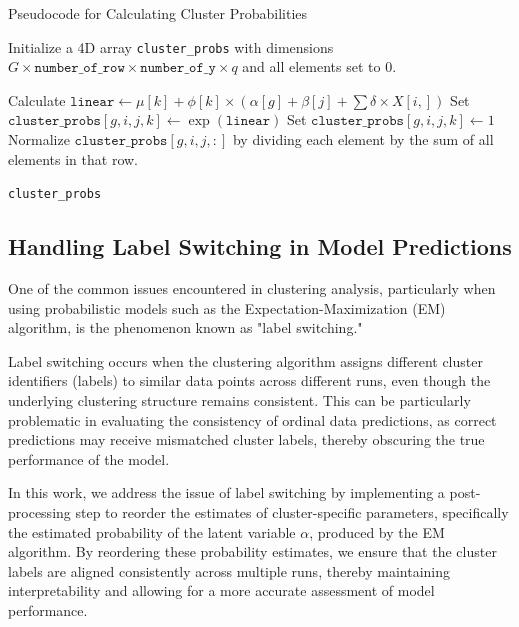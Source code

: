 \documentclass{article}
\begin{document}
\begin{algorithm}
  \caption{Pseudocode for Calculating Cluster Probabilities}
  \label{fig:algo}
  \begin{algorithmic}[1]
  \STATE Initialize a 4D array \texttt{cluster\_probs} with dimensions $G \times \texttt{number\_of\_row} \times \texttt{number\_of\_y} \times q$ and all elements set to 0.
  
                      \STATE Calculate $\texttt{linear} \gets \mu[k] + \phi[k] \times (\alpha[g] + \beta[j] + \sum \delta \times X[i,])$
                      \STATE Set $\texttt{cluster\_probs}[g, i, j, k] \gets \exp(\texttt{linear})$
                  \ELSE
                      \STATE Set $\texttt{cluster\_probs}[g, i, j, k] \gets 1$
                  \ENDIF
              \ENDFOR
              \STATE Normalize $\texttt{cluster\_probs}[g, i, j, :]$ by dividing each element by the sum of all elements in that row.
          \ENDFOR
      \ENDFOR
  \ENDFOR
  
  \RETURN \texttt{cluster\_probs}
  \end{algorithmic}
\end{algorithm}

\subsection{Handling Label Switching in Model Predictions}

One of the common issues encountered in clustering analysis, 
particularly when using probabilistic models such as the Expectation-Maximization (EM) algorithm, 
is the phenomenon known as "label switching." 

Label switching occurs when the clustering algorithm assigns different cluster identifiers (labels) to similar data points across different runs, 
even though the underlying clustering structure remains consistent. 
This can be particularly problematic in evaluating the consistency of ordinal data predictions, 
as correct predictions may receive mismatched cluster labels, 
thereby obscuring the true performance of the model.

In this work, we address the issue of label switching by implementing a post-processing step to reorder the estimates of cluster-specific parameters, 
specifically the estimated probability of the latent variable 
$\alpha$, produced by the EM algorithm. By reordering these probability estimates, 
we ensure that the cluster labels are aligned consistently across multiple runs, 
thereby maintaining interpretability and allowing for a more accurate assessment of model performance.
\end{document}
